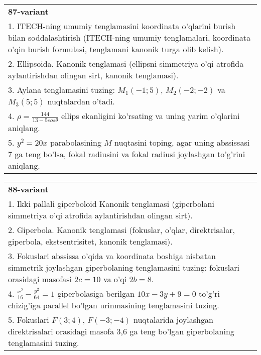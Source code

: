 \documentclass{article}
\begin{document}
\begin{tabular}{m{17cm}}
\textbf{87-variant}\\
1. ITECH-ning umumiy tenglamasini koordinata o'qlarini burish bilan soddalashtirish (ITECH-ning umumiy tenglamalari, koordinata o'qin burish formulasi, tenglamani kanonik turga olib kelish).\\

2. Ellipsoida. Kanonik tenglamasi (ellipsni simmetriya o'qi atrofida aylantirishdan olingan sirt, kanonik tenglamasi).\\

3. Aylana tenglamasini tuzing: $M_1(-1;5)$, $M_2(-2;-2)$ va $M_3(5;5)$ nuqtalardan o'tadi.\\

4. $\rho = \frac{144}{13 - 5cos\theta}$ ellips ekanligini ko'rsating va uning yarim o'qlarini aniqlang.\\

5. $y^{2} = 20x$ parabolasining $M$ nuqtasini toping, agar uning abssissasi 7 ga teng bo'lsa, fokal radiusini va fokal radiusi joylashgan to'g'rini aniqlang.
\end{tabular}
\vspace{1cm}


\begin{tabular}{m{17cm}}
\textbf{88-variant}\\
1. Ikki pallali giperboloid Kanonik tenglamasi (giperbolani simmetriya o'qi atrofida aylantirishdan olingan sirt).\\

2. Giperbola. Kanonik tenglamasi (fokuslar, o'qlar, direktrisalar, giperbola, ekstsentrisitet, kanonik tenglamasi).\\

3. Fokuslari abssissa o'qida va koordinata boshiga nisbatan simmetrik joylashgan giperbolaning tenglamasini tuzing: fokuslari orasidagi masofasi $2c=10$ va o'qi $2b=8$.\\

4. $\frac{x^{2}}{16} - \frac{y^{2}}{64} = 1$ giperbolasiga berilgan $10x - 3y + 9 = 0$ to'g'ri chizig'iga parallel bo'lgan urinmasining tenglamasini tuzing.  \\

5. Fokuslari $F(3;4)$, $F(-3;-4)$ nuqtalarida joylashgan direktrisalari orasidagi masofa 3,6 ga teng bo'lgan giperbolaning tenglamasini tuzing.  
\end{tabular}
\vspace{1cm}
\end{document}

